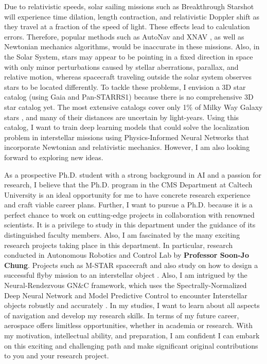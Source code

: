 \documentclass[a4,25pt]{article}
\begin{document}
\begin{large}
Due to relativistic speeds, solar sailing missions such as Breakthrough Starshot will experience time dilation, length contraction, and relativistic Doppler shift as they travel at a fraction of the speed of light. These effects lead to calculation errors. Therefore, popular methods such as AutoNav \cite{team2000autonomous} and XNAV \cite{graven2008xnav}, as well as Newtonian mechanics algorithms, would be inaccurate in these missions. Also, in the Solar System, stars may appear to be pointing in a fixed direction in space with only minor perturbations caused by stellar aberrations, parallax, and relative motion, whereas spacecraft traveling outside the solar system observes stars to be located differently. To tackle these problems, I envision a 3D star catalog (using Gaia and Pan-STARRS1) because there is no comprehensive 3D star catalog yet. The most extensive catalogs cover only 1\% of Milky Way Galaxy stars \cite{mckee2022navigation}, and many of their distances are uncertain by light-years. Using this catalog, I want to train deep learning models that could solve the localization problem in interstellar missions using Physics-Informed Neural Networks that incorporate Newtonian and relativistic mechanics. However, I am also looking forward to exploring new ideas. \par
\vspace{-0.25cm}\quad As a prospective Ph.D. student with a strong background in AI and a passion for research, I believe that the Ph.D. program in the CMS Department at Caltech University is an ideal opportunity for me to have concrete research experience and craft viable career plans. Further, I want to pursue a Ph.D. because it is a perfect chance to work on cutting-edge projects in collaboration with renowned scientists. It is a privilege to study in this department under the guidance of its distinguished faculty members. Also, I am fascinated by the many exciting research projects taking place in this department. In particular, research conducted in Autonomous Robotics and Control Lab by \textbf{Professor Soon-Jo Chung}. Projects such as M-STAR spacecraft \cite{nakka2018six} and also study on how to design a successful flyby mission to an interstellar object \cite{donitz2022interstellar}. Also, I am intrigued by the Neural-Rendezvous GN\&C framework, which uses the Spectrally-Normalized Deep Neural Network and Model Predictive Control to encounter Interstellar objects robustly and accurately \cite{tsukamoto2022neural}. In my studies, I want to learn about all aspects of navigation and develop my research skills. In terms of my future career, aerospace offers limitless opportunities, whether in academia or research. With my motivation, intellectual ability, and preparation, I am confident I can embark on this exciting and challenging path and make significant original contributions to you and your research project.\par

\end{large}
\end{document}
